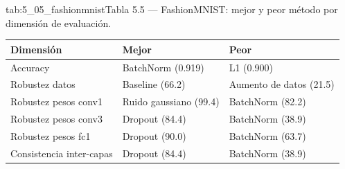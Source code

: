 \begin{table}{tab:5_05_fashionmnist}{Tabla 5.5 — FashionMNIST: mejor y peor método por dimensión de evaluación.}
\small
\begin{tabular}{lll}
\toprule
\textbf{Dimensión} & \textbf{Mejor} & \textbf{Peor} \\
\midrule
Accuracy & BatchNorm (0.919) & L1 (0.900) \\
Robustez datos & Baseline (66.2) & Aumento de datos (21.5) \\
Robustez pesos conv1 & Ruido gaussiano (99.4) & BatchNorm (82.2) \\
Robustez pesos conv3 & Dropout (84.4) & BatchNorm (38.9) \\
Robustez pesos fc1 & Dropout (90.0) & BatchNorm (63.7) \\
Consistencia inter-capas & Dropout (84.4) & BatchNorm (38.9) \\
\bottomrule
\end{tabular}
\end{table}